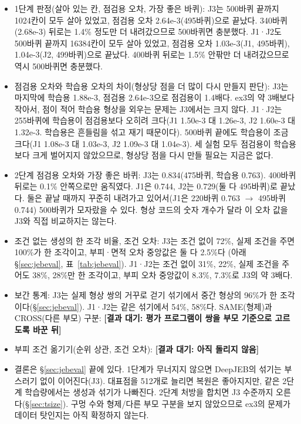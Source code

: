 \documentclass[11pt]{article}
\newcommand{\pending}[1]{\textcolor{red!70!black}{\textbf{[결과 대기: #1]}}}
\begin{document}
\begin{itemize}
\item 1단계 판정(살아 있는 칸, 점검용 오차, 가장 좋은 바퀴): J3는 500바퀴 끝까지 1024칸이 모두 살아 있었고, 점검용 오차 2.64e-3(495바퀴)으로 끝났다.
340바퀴(2.68e-3) 뒤로는 1.4\% 정도만 더 내려갔으므로 500바퀴면 충분했다. J1·J2도 500바퀴 끝까지 16384칸이 모두 살아 있었고,
점검용 오차 1.03e-3(J1, 495바퀴), 1.04e-3(J2, 499바퀴)으로 끝났다. 400바퀴 뒤로는 1.5\% 안팎만 더 내려갔으므로 역시 500바퀴면 충분했다.
\item 점검용 오차와 학습용 오차의 차이(형상당 점을 더 많이 다시 만들지 판단): J3는 마지막에 학습용 1.88e-3, 점검용 2.64e-3으로
점검용이 1.4배다. ex3의 약 3배보다 작아서, 점이 적어 학습용 형상을 외우는 문제는 J3에서는 크지 않다.
J1·J2는 255바퀴에 학습용이 점검용보다 오히려 크다(J1 1.50e-3 대 1.26e-3, J2 1.60e-3 대 1.32e-3. 학습용은 흔들림을 섞고 재기 때문이다). 500바퀴 끝에도 학습용이 조금 크다(J1 1.08e-3 대 1.03e-3, J2 1.09e-3 대 1.04e-3).
세 실험 모두 점검용이 학습용보다 크게 벌어지지 않았으므로, 형상당 점을 다시 만들 필요는 지금은 없다.
\item 2단계 점검용 오차와 가장 좋은 바퀴: J3는 0.834(475바퀴, 학습용 0.763). 400바퀴 뒤로는 0.1\% 안쪽으로만 움직였다. J1은 0.744, J2는 0.729(둘 다 495바퀴)로 끝났다.
둘은 끝날 때까지 꾸준히 내려가고 있어서(J1은 220바퀴 0.763 $\rightarrow$ 495바퀴 0.744) 500바퀴가 모자랐을 수 있다.
형상 코드의 숫자 개수가 달라 이 오차 값을 J3와 직접 비교하지는 않는다.
\item 조건 없는 생성의 한 조각 비율, 조건 오차: J3는 조건 없이 72\%, 실제 조건을 주면 100\%가 한 조각이고, 부피·면적 오차 중앙값은 둘 다 2.5\%다
(아래 \S\ref{sec:jebeval}, 표~\ref{tab:jebeval}). J1·J2는 조건 없이 31\%, 22\%, 실제 조건을 주어도 38\%, 28\%만 한 조각이고,
부피 오차 중앙값이 8.3\%, 7.3\%로 J3의 약 3배다.
\item 보간 통계: J3는 실제 형상 쌍의 거꾸로 걷기 섞기에서 중간 형상의 96\%가 한 조각이다(\S\ref{sec:jebeval}). J1·J2는 같은 섞기에서 54\%, 58\%다.
SAME(형제)과 CROSS(다른 부모) 구분: \pending{평가 프로그램이 쌍을 부모 기준으로 고르도록 바꾼 뒤}
\item 부피 조건 옮기기(순위 상관, 조건 오차): \pending{아직 돌리지 않음}
\item 결론은 \S\ref{sec:jebeval} 끝에 있다. 1단계가 무너지지 않으면 DeepJEB의 섞기는 부스러기 없이 이어진다(J3).
대표점을 512개로 늘리면 복원은 좋아지지만, 같은 2단계 학습량에서는 생성과 섞기가 나빠진다.
2단계 처방을 합치면 J3 수준까지 오른다(\S\ref{sec:tsize}).
구멍 수와 형제/다른 부모 구분을 보지 않았으므로 ex3의 문제가 데이터 탓인지는 아직 확정하지 않는다.
\end{itemize}
\end{document}
